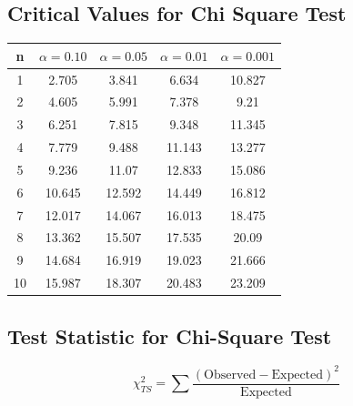 \documentclass[a4paper,12pt]{article}
\begin{document}
\subsection*{Critical Values for Chi Square Test}
{
	\Large
	\begin{center}
		\begin{tabular}{|c|c|c|c|c|}
			\hline 
			n	&	$\alpha=0.10$	&	$\alpha=0.05$	&	$\alpha=0.01$	&	$\alpha=0.001$	\\ \hline
			1	& 	2.705	&	3.841	&	6.634	&	10.827	\\ \hline
			2	&	4.605	&	5.991	&	7.378	&	9.21	\\ \hline
			3	&	6.251	&	7.815	&	9.348	&	11.345	\\ \hline
			4	&	7.779	&	9.488	&	11.143	&	13.277	\\ \hline
			5	&	9.236	&	11.07	&	12.833	&	15.086	\\ \hline
			6	&	10.645	&	12.592	&	14.449	&	16.812	\\ \hline
			7	&	12.017	&	14.067	&	16.013	&	18.475	\\ \hline
			8	&	13.362	&	15.507	&	17.535	&	20.09	\\ \hline
			9	&	14.684	&	16.919	&	19.023	&	21.666	\\ \hline
			10	&	15.987	&	18.307	&	20.483	&	23.209	\\ \hline
		\end{tabular} 
	\end{center}
}
\newpage
\subsection*{Test Statistic for Chi-Square Test}
{
\Large
\[ \chi^2_{TS} = \sum \frac{(\mbox{Observed} -\mbox{Expected} )^2}{\mbox{Expected} }\]
}
\end{document}
